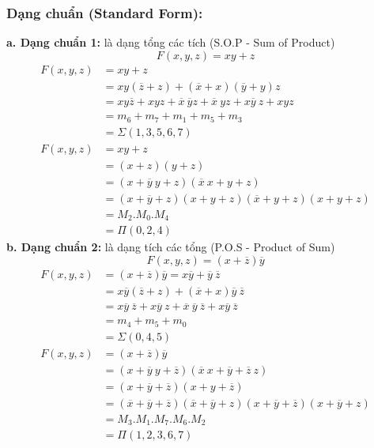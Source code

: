 \subsubsection{Dạng chuẩn (Standard Form):}
\textbf{a. Dạng chuẩn 1:} là dạng tổng các tích (S.O.P - Sum of Product)
\[
    F(x,y,z) = xy + z
\]
\[
    \begin{aligned}
        F(x,y,z) &= xy + z\\
                 &= xy(\overline{z}+z) + (\overline{x}+x)(\overline{y}+y)z\\
                 &= xy\overline{z} + xyz + \overline{x}\ \overline{y} z + \overline{x}\ yz + x\overline{y}\ z + xyz\\
                 &= m_6 + m_7 + m_1 + m_5+ m_3\\
                 &= \varSigma (1,3,5,6,7)\\
        F(x,y,z) &= xy + z\\
                 &= (x+z)(y+z)\\
                 &= (x + \overline{y}\ y + z)(\overline{x}\ x + y +z)\\
                 &= (x + \overline{y} + z)(x+y+z)(\overline{x} + y + z)(x+y+z)\\
                 &= M_2.M_0.M_4\\
                 &= \varPi (0,2,4)
    \end{aligned}
\]
\textbf{b. Dạng chuẩn 2:} là dạng tích các tổng (P.O.S - Product of Sum)
\[
    F(x,y,z) =(x+\overline{z})\overline{y}
\]
\[
    \begin{aligned}
        F(x,y,z) &= (x+\overline{z})\overline{y} = x\overline{y} + \overline{y}\ \overline{z}\\
                 &= x\overline{y}(\overline{z} + z) + (\overline{x} + x)\overline{y}\ \overline{z}\\
                 &= x\overline{y}\ \overline{z} + x\overline{y}\ z + \overline{x}\ \overline{y}\ \overline{z} + x\overline{y}\ \overline{z} \\
                 &= m_4  + m_5 + m_0\\
                 &= \varSigma (0,4,5)\\
        F(x,y,z) &= (x+\overline{z})\overline{y}\\
                 &= (x + \overline{y}\ y + \overline{z})(\overline{x}\ x + \overline{y} + \overline{z}\ z)\\
                 &= (x + \overline{y} + \overline{z})(x + y + \overline{z})\\
                 &= (\overline{x} + \overline{y} + \overline{z})(\overline{x} + \overline{y} + z)(x+\overline{y}+\overline{z})(x + \overline{y} + z)\\
                 &= M_3.M_1.M_7.M_6.M_2\\
                 &= \varPi (1,2,3,6,7)
    \end{aligned}
\]
